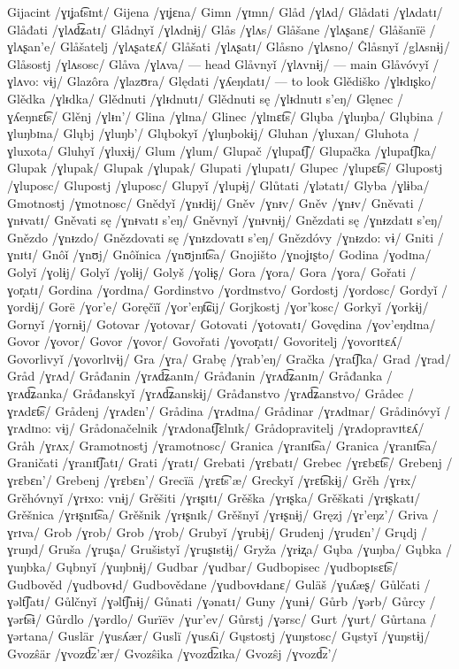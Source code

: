 Gijacint /ɣɪʝat͡sɪnt/
Gijena /ɣɪʝɛna/
Gimn /ɣɪmn/
Glåd /ɣlʌd/
Glådati /ɣlʌdatɪ/
Glåđati /ɣlʌd͡ʑatɪ/
Glådnyǐ /ɣlʌdnɨj/
Glås /ɣlʌs/
Glåšane /ɣlʌʂanɛ/
Glåšanïë /ɣlʌʂan’e/
Glåšatelj /ɣlʌʂatɛʎ/
Glåšati /ɣlʌʂatɪ/
Glåsno /ɣlʌsno/
Ĝlåsnyǐ /glʌsnɨj/
Glåsostj /ɣlʌsosc/
Glåva /ɣlʌva/ — head
Glåvnyǐ /ɣlʌvnɨj/ — main
Glåvóvyǐ /ɣlʌvo: vɨj/
Glazôra /ɣlazʊra/
Ględati /ɣʎeŋdatɪ/ — to look
Glědiško /ɣlᵻdɪʂko/
Glědka /ɣlᵻdka/
Glědnuti /ɣlᵻdnutɪ/
Glědnuti sę /ɣlᵻdnutɪ s’eŋ/
Glęnec /ɣʎeŋnɛt͡s/
Glěnj /ɣlᵻn’/
Glina /ɣlɪna/
Glinec /ɣlɪnɛt͡s/
Glųba /ɣluŋba/
Glųbina /ɣluŋbɪna/
Glųbj /ɣluŋb’/
Glųbokyǐ /ɣluŋbokɨj/
Gluhan /ɣluxan/
Gluhota /ɣluxota/
Gluhyǐ /ɣluxɨj/
Glum /ɣlum/
Glupač /ɣlupat͡ʃ/
Glupačka /ɣlupat͡ʃka/
Glupak /ɣlupak/
Glupak /ɣlupak/
Glupati /ɣlupatɪ/
Glupec /ɣlupɛt͡s/
Glupostj /ɣluposc/
Glupostj /ɣluposc/
Glupyǐ /ɣlupɨj/
Glůtati /ɣlətatɪ/
Glyba /ɣlɨba/
Gmotnostj /ɣmotnosc/
Gnědyǐ /ɣnᵻdɨj/
Gněv /ɣnᵻv/
Gněv /ɣnᵻv/
Gněvati /ɣnᵻvatɪ/
Gněvati sę /ɣnᵻvatɪ s’eŋ/
Gněvnyǐ /ɣnᵻvnɨj/
Gnězdati sę /ɣnᵻzdatɪ s’eŋ/
Gnězdo /ɣnᵻzdo/
Gnězdovati sę /ɣnᵻzdovatɪ s’eŋ/
Gnězdóvy /ɣnᵻzdo: vɨ/
Gniti /ɣnɪtɪ/
Gnôǐ /ɣnʊj/
Gnôǐnica /ɣnʊjnɪt͡sa/
Gnojišto /ɣnoʝɪʂto/
Godina /ɣodɪna/
Golyǐ /ɣolɨj/
Golyǐ /ɣolɨj/
Golyš /ɣolɨʂ/
Gora /ɣora/
Gora /ɣora/
Gořati /ɣor̝atɪ/
Gordina /ɣordɪna/
Gordinstvo /ɣordɪnstvo/
Gordostj /ɣordosc/
Gordyǐ /ɣordɨj/
Gorë /ɣor’e/
Goręčïǐ /ɣor’eŋt͡ɕij/
Gorjkostj /ɣor’kosc/
Gorkyǐ /ɣorkɨj/
Gornyǐ /ɣornɨj/
Gotovar /ɣotovar/
Gotovati /ɣotovatɪ/
Govędina /ɣov’eŋdɪna/
Govor /ɣovor/
Govor /ɣovor/
Govořati /ɣovor̝atɪ/
Govoritelj /ɣovorɪtɛʎ/
Govorlivyǐ /ɣovorlɪvɨj/
Gra /ɣra/
Grabę /ɣrab’eŋ/
Gračka /ɣrat͡ʃka/
Grad /ɣrad/
Gråd /ɣrʌd/
Gråđanin /ɣrʌd͡ʑanɪn/
Gråđanin /ɣrʌd͡ʑanɪn/
Gråđanka /ɣrʌd͡ʑanka/
Gråđanskyǐ /ɣrʌd͡ʑanskɨj/
Gråđanstvo /ɣrʌd͡ʑanstvo/
Grådec /ɣrʌdɛt͡s/
Grådenj /ɣrʌdɛn’/
Grådina /ɣrʌdɪna/
Grådinar /ɣrʌdɪnar/
Grådinóvyǐ /ɣrʌdɪno: vɨj/
Grådonačelnik /ɣrʌdonat͡ʃɛlnɪk/
Grådopravitelj /ɣrʌdopravɪtɛʎ/
Gråh /ɣrʌx/
Gramotnostj /ɣramotnosc/
Granica /ɣranɪt͡sa/
Granica /ɣranɪt͡sa/
Graničati /ɣranɪt͡ʃatɪ/
Grati /ɣratɪ/
Grebati /ɣrɛbatɪ/
Grebec /ɣrɛbɛt͡s/
Grebenj /ɣrɛbɛn’/
Grebenj /ɣrɛbɛn’/
Grecïä /ɣrɛt͡s’æ/
Greckyǐ /ɣrɛt͡skɨj/
Grěh /ɣrᵻx/
Grěhóvnyǐ /ɣrᵻxo: vnɨj/
Grěšiti /ɣrᵻʂɪtɪ/
Grěška /ɣrᵻʂka/
Grěškati /ɣrᵻʂkatɪ/
Grěšnica /ɣrᵻʂnɪt͡sa/
Grěšnik /ɣrᵻʂnɪk/
Grěšnyǐ /ɣrᵻʂnɨj/
Gręzj /ɣr’eŋz’/
Griva /ɣrɪva/
Grob /ɣrob/
Grob /ɣrob/
Grubyǐ /ɣrubɨj/
Grudenj /ɣrudɛn’/
Grųdj /ɣruŋd/
Gruša /ɣruʂa/
Grušistyǐ /ɣruʂɪstɨj/
Gryža /ɣrɨʐa/
Gųba /ɣuŋba/
Gųbka /ɣuŋbka/
Gųbnyǐ /ɣuŋbnɨj/
Gudbar /ɣudbar/
Gudbopisec /ɣudbopɪsɛt͡s/
Gudbověd /ɣudbovᵻd/
Gudbovědane /ɣudbovᵻdanɛ/
Guläš /ɣuʎæʂ/
Gůlčati /ɣəlt͡ʃatɪ/
Gůlčnyǐ /ɣəlt͡ʃnɨj/
Gůnati /ɣənatɪ/
Guny /ɣunɨ/
Gůrb /ɣərb/
Gůrcy /ɣərt͡sɨ/
Gůrdlo /ɣərdlo/
Gurïëv /ɣur’ev/
Gůrstj /ɣərsc/
Gurt /ɣurt/
Gůrtana /ɣərtana/
Guslär /ɣusʎær/
Guslï /ɣusʎi/
Gųstostj /ɣuŋstosc/
Gųstyǐ /ɣuŋstɨj/
Gvozŝär /ɣvozd͡z’ær/
Gvozŝika /ɣvozd͡zɪka/
Gvozŝj /ɣvozd͡z’/